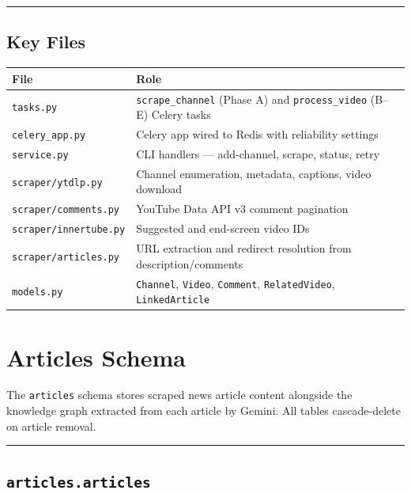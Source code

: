 \documentclass[
]{article}
\newcounter{none} %
\begin{document}
\begin{center}\rule{0.5\linewidth}{0.5pt}\end{center}

\subsection{Key Files}\label{key-files-1}

{\def\LTcaptype{none} %
\begin{longtable}[]{@{}ll@{}}
\toprule\noalign{}
File & Role \\
\midrule\noalign{}
\endhead
\bottomrule\noalign{}
\endlastfoot
\texttt{tasks.py} & \texttt{scrape\_channel} (Phase A) and
\texttt{process\_video} (B--E) Celery tasks \\
\texttt{celery\_app.py} & Celery app wired to Redis with reliability
settings \\
\texttt{service.py} & CLI handlers --- add-channel, scrape, status,
retry \\
\texttt{scraper/ytdlp.py} & Channel enumeration, metadata, captions,
video download \\
\texttt{scraper/comments.py} & YouTube Data API v3 comment pagination \\
\texttt{scraper/innertube.py} & Suggested and end-screen video IDs \\
\texttt{scraper/articles.py} & URL extraction and redirect resolution
from description/comments \\
\texttt{models.py} & \texttt{Channel}, \texttt{Video}, \texttt{Comment},
\texttt{RelatedVideo}, \texttt{LinkedArticle} \\
\end{longtable}
}

\label{file-articles-schema}
\section{Articles Schema}\label{articles-schema}

The \texttt{articles} schema stores scraped news article content
alongside the knowledge graph extracted from each article by Gemini. All
tables cascade-delete on article removal.

\begin{center}\rule{0.5\linewidth}{0.5pt}\end{center}

\subsection{\texorpdfstring{\texttt{articles.articles}}{articles.articles}}\label{articlesarticles}
\end{document}
